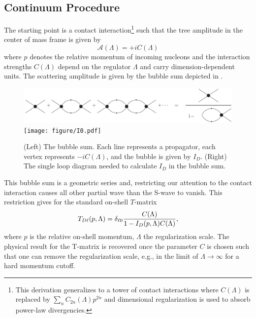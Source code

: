 \subsection{Continuum Procedure}\label{sec:continuum}
The starting point is a contact interaction\footnote{This derivation generalizes to a tower of contact interactions where $C(\Lambda)$ is replaced by $\sum_n C_{2n}(\Lambda) p^{2n}$ \cite{Kaplan:1998we,Beane:2003da} and dimensional regularization is used to absorb power-law divergencies.} such that the tree amplitude in the center of mass frame is given by
\begin{equation}
    \mathcal A(\Lambda) = + i C(\Lambda)
\end{equation}
where $p$ denotes the relative momentum of incoming nucleons and the interaction strengths $ C(\Lambda)$ depend on the regulator $\Lambda$ and carry dimension-dependent units.
The scattering amplitude is given by the bubble sum depicted in .

\begin{figure}[ht!]
\center
\includegraphics[width=.675\columnwidth]{figure/bubbleSum.pdf}
\hfill
\texttt{[image: figure/I0.pdf]}
\caption{(Left) The bubble sum. Each line represents a propagator, each vertex represents $-i C(\Lambda)$, and the bubble is given by $I_D$.
(Right) The single loop diagram needed to calculate $I_D$ in the bubble sum.
\label{fig:bubbleSum}}
\end{figure}

This bubble sum is a geometric series and, restricting our attention to the contact interaction causes all other partial wave than the S-wave to vanish.
This restriction gives for the standard on-shell $T$-matrix
\begin{equation}\label{eq:T matrix}
T_{D\ell}(p, \Lambda) = \delta_{\ell 0} \frac{C(\Lambda)}{1-I_D(p,\Lambda) C(\Lambda)},
\end{equation}
where $p$ is the relative on-shell momentum, $\Lambda$ the regularization scale.
The physical result for the T-matrix is recovered once the parameter $C$ is chosen such that one can remove the regularization scale, e.g., in the limit of $\Lambda \to \infty$ for a hard momentum cutoff.

